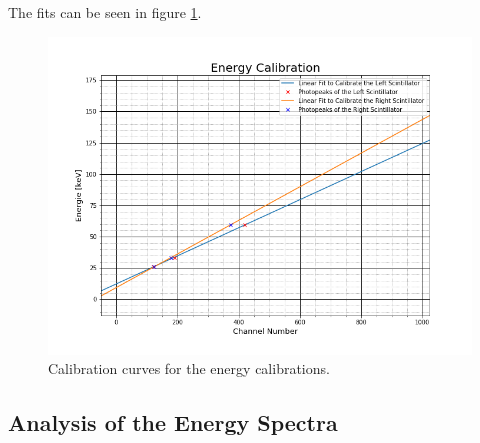 \documentclass[30pt,a4paper]{article}
\begin{document}
	The fits can be seen in figure \ref{EnergieCalib}.
	\begin{figure}[h]
		\includegraphics[scale=0.5]{Bilder/EnergyCalib}
		\centering
		\caption[Energy Calibration Curves]{Calibration curves for the energy calibrations.}
		\label{EnergieCalib}
	\end{figure}
 	\subsection{Analysis of the Energy Spectra}
\end{document}
